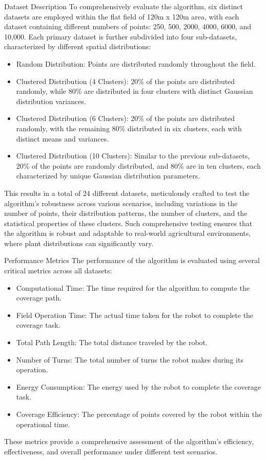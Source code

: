 \vspace*{6mm}  

Dataset Description
To comprehensively evaluate the algorithm, six distinct datasets are employed within the flat field of 120m x 120m area, with each dataset containing different numbers of points: 250, 500, 2000, 4000, 6000, and 10,000. Each primary dataset is further subdivided into four sub-datasets, characterized by different spatial distributions:

\begin{itemize}
    \item Random Distribution: Points are distributed randomly throughout the field.
    \item Clustered Distribution (4 Clusters): 20\% of the points are distributed randomly, while 80\% are distributed in four clusters with distinct Gaussian distribution variances.
    \item Clustered Distribution (6 Clusters): 20\% of the points are distributed randomly, with the remaining 80\% distributed in six clusters, each with distinct means and variances.
    \item Clustered Distribution (10 Clusters): Similar to the previous sub-datasets, 20\% of the points are randomly distributed, and 80\% are in ten clusters, each characterized by unique Gaussian distribution parameters.
\end{itemize}

This results in a total of 24 different datasets, meticulously crafted to test the algorithm's robustness across various scenarios, including variations in the number of points, their distribution patterns, the number of clusters, and the statistical properties of these clusters. Such comprehensive testing ensures that the algorithm is robust and adaptable to real-world agricultural environments, where plant distributions can significantly vary.

\vspace*{6mm}  

Performance Metrics
The performance of the algorithm is evaluated using several critical metrics across all datasets:

\begin{itemize}
    \item Computational Time: The time required for the algorithm to compute the coverage path.
    \item Field Operation Time: The actual time taken for the robot to complete the coverage task.
    \item Total Path Length: The total distance traveled by the robot.
    \item Number of Turns: The total number of turns the robot makes during its operation.
    \item Energy Consumption: The energy used by the robot to complete the coverage task.
    \item Coverage Efficiency: The percentage of points covered by the robot within the operational time.
\end{itemize}
These metrics provide a comprehensive assessment of the algorithm's efficiency, effectiveness, and overall performance under different test scenarios.

